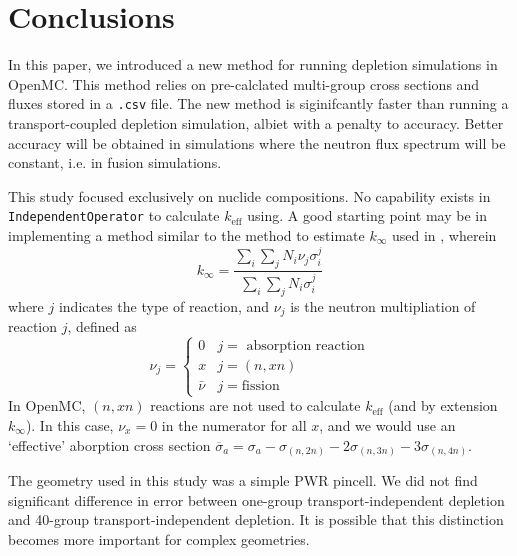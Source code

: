 \section{Conclusions}\label{sec:conclusion}
    In this paper, we introduced a new method for running depletion simulations
    in OpenMC. This method relies on pre-calclated multi-group cross sections
    and fluxes stored in a \verb,.csv, file. The new method is siginifcantly
    faster than running a transport-coupled depletion simulation, albiet with a
    penalty to accuracy. Better accuracy will be obtained in simulations where
    the neutron flux spectrum will be constant, i.e. in fusion simulations.
         
    This study focused exclusively on nuclide compositions. No capability exists
    in \verb.IndependentOperator. to calculate $k_\text{eff}$ using. A good
    starting point may be in implementing a method similar to the method to estimate
    $k_{\infty}$ used in \cite{LOVECKY2014333}, wherein
    \begin{equation}
        k_{\infty} = \frac{\sum_{i} \sum_{j} N_{i} \nu_{j}
        \sigma_{i}^{j}}{\sum_{i}\sum_{j} N_{i} \sigma_{i}^{j}}  
    \end{equation}
    where $j$ indicates the type of reaction, and $\nu_{j}$ is the neutron
    multipliation of reaction $j$, defined as
    \begin{equation}
        \nu_j = \begin{cases}
            0 & j=\text{ absorption reaction}\\
            x & j=(n,xn)\\
            \bar{\nu} & j=\text{fission}
        \end{cases}
    \end{equation}
    In OpenMC, $(n,xn)$ reactions are not used to calculate $k_\text{eff}$ (and
    by extension $k_{\infty}$). In this case, $\nu_{x} = 0$ in the numerator for
    all $x$, and we would use an `effective' aborption cross section
    $\overline{\sigma}_{a} = \sigma_{a} - \sigma_{(n,2n)} - 2\sigma_{(n,3n)} -
    3\sigma_{(n,4n)}$. 

    The geometry used in this study was a simple PWR pincell. We did not find
    significant difference in error between one-group transport-independent
    depletion and 40-group transport-independent depletion. It is possible that 
    this distinction becomes more important for complex geometries.
